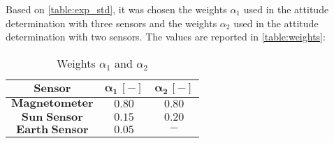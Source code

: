 Based on \autoref{table:exp_std}, it was chosen the weights $\alpha_1$ used in the attitude determination with three sensors and the weights $\alpha_2$ used in the attitude determination with two sensors. The values are reported in \autoref{table:weights}:

\begin{table}[H]

    \centering
    \begin{tabular}{|c|c|c|}
    \hline
    $\bm{Sensor}$ & $\bm{\alpha_{1}\, [-]}$ & $\bm{\alpha_{2} \, [-]}$ \\
    \hline
    $\bm{Magnetometer}$ & $0.80$ & $0.80$  \\
    \hline
    $\bm{Sun\;Sensor}$ & $0.15$ & $0.20$  \\
    \hline
    $\bm{Earth\;Sensor}$ & $0.05$ & $\bm{-}$  \\
    \hline
    \end{tabular}
    
    \caption{Weights $\alpha_{1}$ and $\alpha_{2}$}
    \label{table:weights}
    
\end{table}
